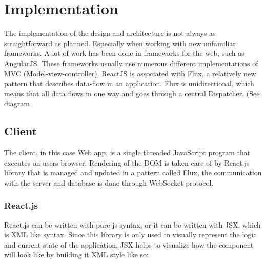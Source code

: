 \chapter{Implementation}
The implementation of the design and architecture is not always as straightforward as planned. Especially when working with new unfamiliar frameworks. A lot of work has been done in frameworks for the web, such as AngularJS. These frameworks usually use numerous different implementations of MVC (Model-view-controller). ReactJS is associated with Flux, a relatively new pattern that describes data-flow in an application. Flux is unidirectional, which means that all data flows in one way and goes through a central Dispatcher. (See diagram 
\section{Client}
The client, in this case Web app, is a single threaded JavaScript program that executes on users browser. Rendering of the DOM is taken care of by React.js library that is managed and updated in a pattern called Flux, the communication with the server and database is done through WebSocket protocol.
\subsection{React.js}
React.js can be written with pure js syntax, or it can be written with JSX, which is XML like syntax. Since this library is only used to visually represent the logic and current state of the application, JSX helps to visualize how the component will look like by building it XML style like so:



